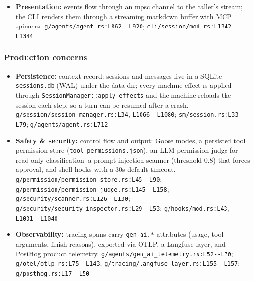 \begin{itemize}
\item \textbf{Presentation:} events flow through an mpsc channel to the caller's stream; the CLI renders them through a streaming markdown buffer with MCP spinners. \texttt{g/\allowbreak{}agents/\allowbreak{}agent.\allowbreak{}rs:\allowbreak{}L862-\allowbreak{}-\allowbreak{}L920}; \texttt{cli/\allowbreak{}session/\allowbreak{}mod.\allowbreak{}rs:\allowbreak{}L1342-\allowbreak{}-\allowbreak{}L1344}
\end{itemize}

\subsubsection*{Production concerns}
\begin{itemize}
\item \textbf{Persistence:} context record: sessions and messages live in a SQLite \texttt{sessions.\allowbreak{}db} (WAL) under the data dir; every machine effect is applied through \texttt{SessionManager:\allowbreak{}:\allowbreak{}apply\_\allowbreak{}effects} and the machine reloads the session each step, so a turn can be resumed after a crash. \texttt{g/\allowbreak{}session/\allowbreak{}session\_\allowbreak{}manager.\allowbreak{}rs:\allowbreak{}L34}, \texttt{L1066-\allowbreak{}-\allowbreak{}L1080}; \texttt{sm/\allowbreak{}session.\allowbreak{}rs:\allowbreak{}L33-\allowbreak{}-\allowbreak{}L79}; \texttt{g/\allowbreak{}agents/\allowbreak{}agent.\allowbreak{}rs:\allowbreak{}L712}
\item \textbf{Safety \& security:} control flow and output: Goose modes, a persisted tool permission store (\texttt{tool\_\allowbreak{}permissions.\allowbreak{}json}), an LLM permission judge for read-only classification, a prompt-injection scanner (threshold 0.8) that forces approval, and shell hooks with a 30s default timeout. \texttt{g/\allowbreak{}permission/\allowbreak{}permission\_\allowbreak{}store.\allowbreak{}rs:\allowbreak{}L45-\allowbreak{}-\allowbreak{}L90}; \texttt{g/\allowbreak{}permission/\allowbreak{}permission\_\allowbreak{}judge.\allowbreak{}rs:\allowbreak{}L145-\allowbreak{}-\allowbreak{}L158}; \texttt{g/\allowbreak{}security/\allowbreak{}scanner.\allowbreak{}rs:\allowbreak{}L126-\allowbreak{}-\allowbreak{}L130}; \texttt{g/\allowbreak{}security/\allowbreak{}security\_\allowbreak{}inspector.\allowbreak{}rs:\allowbreak{}L29-\allowbreak{}-\allowbreak{}L53}; \texttt{g/\allowbreak{}hooks/\allowbreak{}mod.\allowbreak{}rs:\allowbreak{}L43}, \texttt{L1031-\allowbreak{}-\allowbreak{}L1040}
\item \textbf{Observability:} tracing spans carry \texttt{gen\_\allowbreak{}ai.\allowbreak{}*} attributes (usage, tool arguments, finish reasons), exported via OTLP, a Langfuse layer, and PostHog product telemetry. \texttt{g/\allowbreak{}agents/\allowbreak{}gen\_\allowbreak{}ai\_\allowbreak{}telemetry.\allowbreak{}rs:\allowbreak{}L52-\allowbreak{}-\allowbreak{}L70}; \texttt{g/\allowbreak{}otel/\allowbreak{}otlp.\allowbreak{}rs:\allowbreak{}L75-\allowbreak{}-\allowbreak{}L143}; \texttt{g/\allowbreak{}tracing/\allowbreak{}langfuse\_\allowbreak{}layer.\allowbreak{}rs:\allowbreak{}L155-\allowbreak{}-\allowbreak{}L157}; \texttt{g/\allowbreak{}posthog.\allowbreak{}rs:\allowbreak{}L17-\allowbreak{}-\allowbreak{}L50}

\end{itemize}
